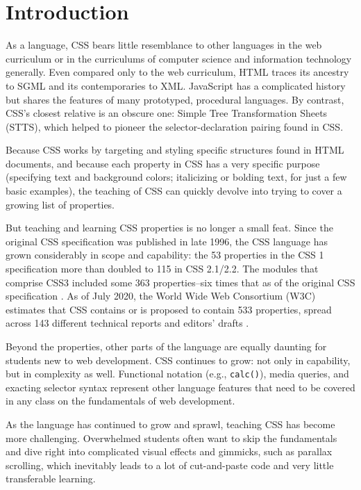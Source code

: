 \documentclass[sigplan,screen]{acmart}
\begin{document}
\section{Introduction}

As a language, CSS bears little resemblance to other languages in the web curriculum or in the curriculums of computer science and information technology generally. Even compared only to the web curriculum, HTML traces its ancestry to SGML and its contemporaries to XML. JavaScript has a complicated history but shares the features of many prototyped, procedural languages. By contrast, CSS’s closest relative is an obscure one: Simple Tree Transformation Sheets (STTS)\cite{w3c:briefhistory}, which helped to pioneer the 
    selector-\linebreak declaration pairing found in CSS.

Because CSS works by targeting and styling specific structures found in HTML documents, and because each property in CSS has a very specific purpose (specifying text and background colors; italicizing or bolding text, for just a few basic examples), the teaching of CSS can quickly devolve into trying to cover a growing list of properties.

But teaching and learning CSS properties is no longer a small feat. Since the original CSS specification was published in late 1996, the CSS language has grown considerably in scope and capability: the 53 properties in the CSS 1 specification more than doubled to 115 in CSS 2.1/2.2. The modules that comprise CSS3 included some 363 properties--six times that as of the original CSS specification \cite{jom:css}. As of July 2020, the World Wide Web Consortium (W3C) estimates that CSS contains or is proposed to contain 533 properties, spread across 143 different technical reports and editors' drafts \cite{w3c:iop}.

Beyond the properties, other parts of the language are equally daunting for students new to web development. CSS continues to grow: not only in capability, but in complexity as well. Functional notation (e.g., \verb|calc()|), media queries, and exacting selector syntax represent other language features that need to be covered in any class on the fundamentals of web development.

As the language has continued to grow and sprawl, teaching CSS has become more challenging. Overwhelmed students often want to skip the fundamentals and dive right into complicated visual effects and gimmicks, such as parallax scrolling, which inevitably leads to a lot of cut-and-paste code and very little transferable learning.
\end{document}
